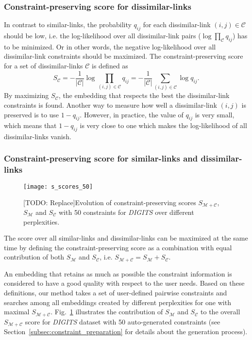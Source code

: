 \subsubsection*{Constraint-preserving score for dissimilar-links}
In contrast to similar-links, the probability $q_{ij}$ for each dissimilar-link $(i,j) \in \mathcal{C}$ should be low, i.e. the log-likelihood over all dissimilar-link pairs ($\log \prod_{\mathcal{C}} q_{ij}$) has to be minimized. Or in other words, the negative log-likelihood over all dissimilar-link constraints should be maximized. The constraint-preserving score for a set of dissimilar-links $\mathcal{C}$ is defined as
\begin{equation}
S_{\mathcal{C}} = -\frac{1}{|\mathcal{C}|} \log \prod_{(i,j) \in \mathcal{C}} q_{ij}
                = -\frac{1}{|\mathcal{C}|} \sum_{(i,j) \in \mathcal{C}} \log q_{ij}.
\end{equation}
By maximizing $S_{\mathcal{C}}$, the embedding that respects the best the dissimilar-link constraints is found.
Another way to measure how well a dissimilar-link $(i,j)$ is preserved is to use $1 - q_{ij}$. However, in practice, the value of $q_{ij}$ is very small, which means that $1 - q_{ij}$ is very close to one which makes the log-likelihood of all dissimilar-links vanish.

\subsubsection*{Constraint-preserving score for similar-links and dissimilar-links}

\begin{figure}
    \centering
    \texttt{[image: s\_scores\_50]}
    \caption{[TODO: Replace]Evolution of constraint-preserving scores $S_{\mathcal{M}+\mathcal{C}}$, $S_{\mathcal{M}}$ and $S_{\mathcal{C}}$ with 50 constraints for \emph{DIGITS} over different perplexities.}
    \label{fig:s_scores_mnist}
\end{figure}

The score over all similar-links and dissimilar-links can be maximized at the same time by defining the constraint-preserving score as a combination with equal contribution of both $S_{\mathcal{M}}$ and $S_{\mathcal{C}}$, i.e. $S_{\mathcal{M}+\mathcal{C}} = S_{\mathcal{M}} + S_{\mathcal{C}}$.

An embedding that retains as much as possible the constraint information is considered to have a good quality with respect to the user needs.
Based on these definitions, our method takes a set of user-defined pairwise constraints and searches among all embeddings created by different perplexities for one with maximal $S_{\mathcal{M}+\mathcal{C}}$.
Fig.~\ref{fig:s_scores_mnist} illustrates the contribution of $S_{\mathcal{M}}$ and $S_{\mathcal{C}}$ to the overall $S_{\mathcal{M}+\mathcal{C}}$ score for \emph{DIGITS} dataset with 50 auto-generated constraints (see Section~\ref{subsec:constraint_preparation} for details about the generation process).

